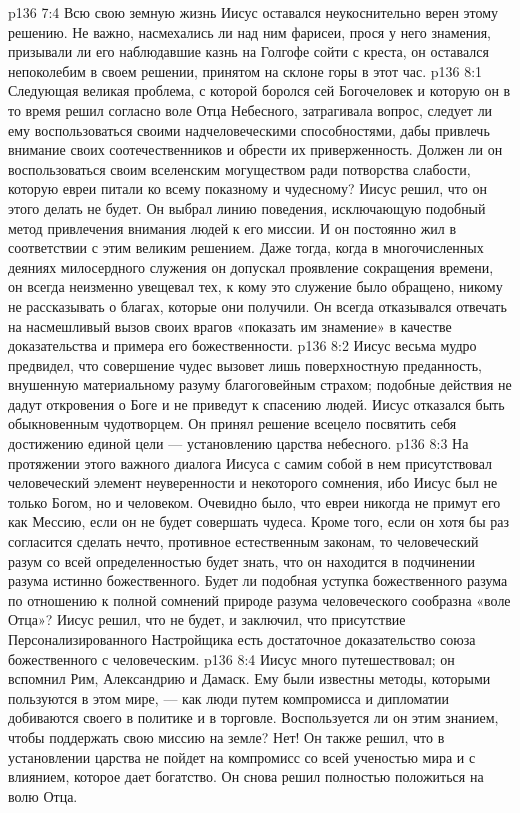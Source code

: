 \vs p136 7:4 Всю свою земную жизнь Иисус оставался неукоснительно верен этому решению. Не важно, насмехались ли над ним фарисеи, прося у него знамения, призывали ли его наблюдавшие казнь на Голгофе сойти с креста, он оставался непоколебим в своем решении, принятом на склоне горы в этот час.
\vs p136 8:1 Следующая великая проблема, с которой боролся сей Богочеловек и которую он в то время решил согласно воле Отца Небесного, затрагивала вопрос, следует ли ему воспользоваться своими надчеловеческими способностями, дабы привлечь внимание своих соотечественников и обрести их приверженность. Должен ли он воспользоваться своим вселенским могуществом ради потворства слабости, которую евреи питали ко всему показному и чудесному? Иисус решил, что он этого делать не будет. Он выбрал линию поведения, исключающую подобный метод привлечения внимания людей к его миссии. И он постоянно жил в соответствии с этим великим решением. Даже тогда, когда в многочисленных деяниях милосердного служения он допускал проявление сокращения времени, он всегда неизменно увещевал тех, к кому это служение было обращено, никому не рассказывать о благах, которые они получили. Он всегда отказывался отвечать на насмешливый вызов своих врагов «показать им знамение» в качестве доказательства и примера его божественности.
\vs p136 8:2 Иисус весьма мудро предвидел, что совершение чудес вызовет лишь поверхностную преданность, внушенную материальному разуму благоговейным страхом; подобные действия не дадут откровения о Боге и не приведут к спасению людей. Иисус отказался быть обыкновенным чудотворцем. Он принял решение всецело посвятить себя достижению единой цели --- установлению царства небесного.
\vs p136 8:3 \pc На протяжении этого важного диалога Иисуса с самим собой в нем присутствовал человеческий элемент неуверенности и некоторого сомнения, ибо Иисус был не только Богом, но и человеком. Очевидно было, что евреи никогда не примут его как Мессию, если он не будет совершать чудеса. Кроме того, если он хотя бы раз согласится сделать нечто, противное естественным законам, то человеческий разум со всей определенностью будет знать, что он находится в подчинении разума истинно божественного. Будет ли подобная уступка божественного разума по отношению к полной сомнений природе разума человеческого сообразна «воле Отца»? Иисус решил, что не будет, и заключил, что присутствие Персонализированного Настройщика есть достаточное доказательство союза божественного с человеческим.
\vs p136 8:4 \pc Иисус много путешествовал; он вспомнил Рим, Александрию и Дамаск. Ему были известны методы, которыми пользуются в этом мире, --- как люди путем компромисса и дипломатии добиваются своего в политике и в торговле. Воспользуется ли он этим знанием, чтобы поддержать свою миссию на земле? Нет! Он также решил, что в установлении царства не пойдет на компромисс со всей ученостью мира и с влиянием, которое дает богатство. Он снова решил полностью положиться на волю Отца.
